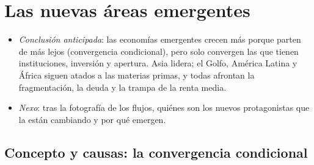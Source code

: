 \documentclass[11pt]{article}
\begin{document}
\section{Las nuevas áreas emergentes}\label{sec:emergentes}

\begin{itemize}
\item \emph{Conclusión anticipada}: las economías emergentes crecen más porque parten de más lejos (convergencia condicional), pero solo convergen las que tienen instituciones, inversión y apertura. Asia lidera; el Golfo, América Latina y África siguen atados a las materias primas, y todas afrontan la fragmentación, la deuda y la trampa de la renta media.
\item \emph{Nexo}: tras la fotografía de los flujos, quiénes son los nuevos protagonistas que la están cambiando y por qué emergen.
\end{itemize}

\subsection{Concepto y causas: la convergencia condicional}\label{sec:convergencia}
\end{document}
